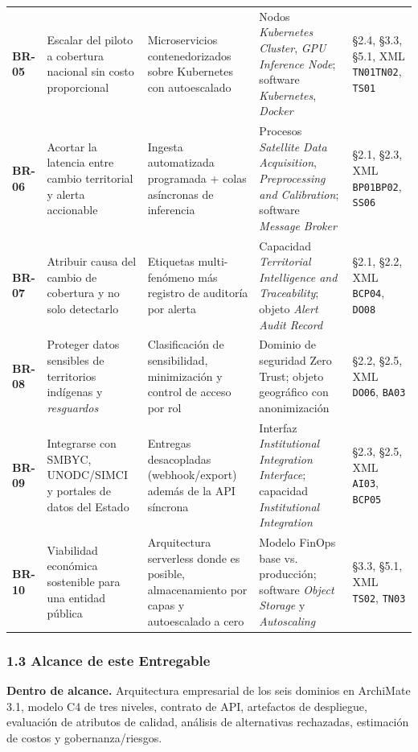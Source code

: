 \documentclass{article}
\begin{document}
{\begin{longtable}{@{}L{0.40in}L{1.35in}L{1.56in}L{1.75in}L{0.75in}@{}}
\textbf{BR-05} & Escalar del piloto a cobertura nacional sin costo proporcional & Microservicios contenedorizados sobre Kubernetes con autoescalado & Nodos \emph{Kubernetes Cluster}, \emph{GPU Inference Node}; software \emph{Kubernetes}, \emph{Docker} & \S{}2.4, \S{}3.3, \S{}5.1, XML \texttt{TN01}\textendash{}\texttt{TN02}, \texttt{TS01} \\
\textbf{BR-06} & Acortar la latencia entre cambio territorial y alerta accionable & Ingesta automatizada programada + colas asíncronas de inferencia & Procesos \emph{Satellite Data Acquisition}, \emph{Preprocessing and Calibration}; software \emph{Message Broker} & \S{}2.1, \S{}2.3, XML \texttt{BP01}\textendash{}\texttt{BP02}, \texttt{SS06} \\
\textbf{BR-07} & Atribuir causa del cambio de cobertura y no solo detectarlo & Etiquetas multi-fenómeno más registro de auditoría por alerta & Capacidad \emph{Territorial Intelligence and Traceability}; objeto \emph{Alert Audit Record} & \S{}2.1, \S{}2.2, XML \texttt{BCP04}, \texttt{DO08} \\
\textbf{BR-08} & Proteger datos sensibles de territorios indígenas y \emph{resguardos} & Clasificación de sensibilidad, minimización y control de acceso por rol & Dominio de seguridad Zero Trust; objeto geográfico con anonimización & \S{}2.2, \S{}2.5, XML \texttt{DO06}, \texttt{BA03} \\
\textbf{BR-09} & Integrarse con SMBYC, UNODC/SIMCI y portales de datos del Estado & Entregas desacopladas (webhook/export) además de la API síncrona & Interfaz \emph{Institutional Integration Interface}; capacidad \emph{Institutional Integration} & \S{}2.3, \S{}2.5, XML \texttt{AI03}, \texttt{BCP05} \\
\textbf{BR-10} & Viabilidad económica sostenible para una entidad pública & Arquitectura serverless donde es posible, almacenamiento por capas y autoescalado a cero & Modelo FinOps base vs. producción; software \emph{Object Storage} y \emph{Autoscaling} & \S{}3.3, \S{}5.1, XML \texttt{TS02}, \texttt{TN03} \\
\end{longtable}
}

\subsubsection{1.3 Alcance de este Entregable}

\textbf{Dentro de alcance.} Arquitectura empresarial de los seis dominios en ArchiMate 3.1, modelo C4 de tres niveles, contrato de API, artefactos de despliegue, evaluación de atributos de calidad, análisis de alternativas rechazadas, estimación de costos y gobernanza/riesgos.
\end{document}

